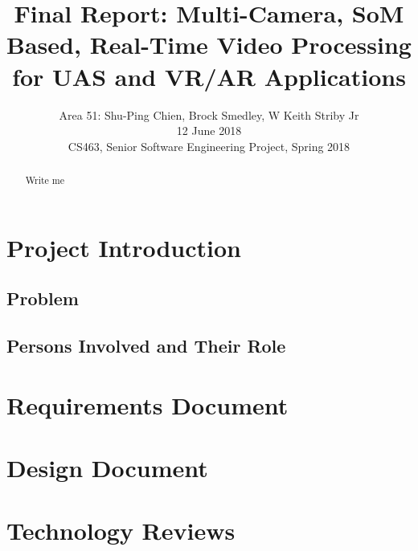 \documentclass[letterpaper,10pt,serif,draftclsnofoot,onecolumn,compsoc,titlepage]{IEEEtran}
\title{Final Report: Multi-Camera, SoM Based, Real-Time Video Processing for UAS and VR/AR Applications}
\author{Area 51: Shu-Ping Chien, Brock Smedley, W Keith Striby Jr \\ 12 June 2018 \\ CS463, Senior Software Engineering Project, Spring 2018}
\begin{document}
\begin{titlepage}
\maketitle

\begin{abstract}

Write me \\


\thispagestyle{empty}
\end{abstract}
\end{titlepage}

\newpage
\tableofcontents

\newpage

\section{Project Introduction}

\subsection{Problem}

\subsection{Persons Involved and Their Role}

\newpage 

\section{Requirements Document}



\section{Design Document}



\newpage

\section{Technology Reviews}
\end{document}
